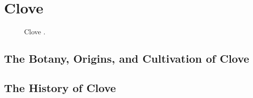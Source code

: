 \section{Clove}
\label{sec:clove}



\begin{figure}[!ht]
	\vspace{-4ex}
	\centering
	\hfill
	\hfill
	\caption{Clove \textit{}.}
	\label{fig:clove_imgs}
\end{figure}

\subsection{The Botany, Origins, and Cultivation of Clove}

\subsection{The History of Clove}

